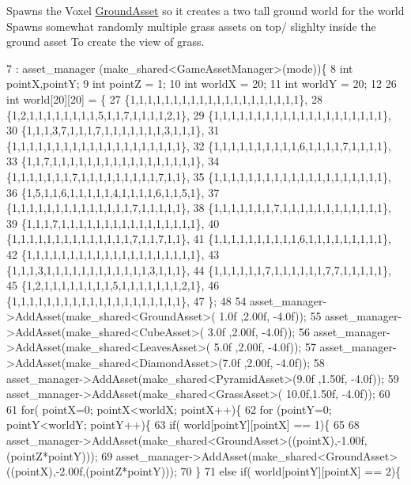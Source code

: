Spawns the Voxel \hyperlink{classGroundAsset}{Ground\+Asset} so it creates a two tall ground world for the world Spawns somewhat randomly multiple grass assets on top/ slighlty inside the ground asset To create the view of grass.
\begin{DoxyCode}
7                                           : asset\_manager (make\_shared<GameAssetManager>(mode))\{
8   \textcolor{keywordtype}{int} pointX,pointY;
9   \textcolor{keywordtype}{int} pointZ = 1;
10   \textcolor{keywordtype}{int} worldX = 20;
11   \textcolor{keywordtype}{int} worldY = 20;
12 
26   \textcolor{keywordtype}{int} world[20][20] = \{
27   \{1,1,1,1,1,1,1,1,1,1,1,1,1,1,1,1,1,1,1,1\},
28   \{1,2,1,1,1,1,1,1,1,1,5,1,1,7,1,1,1,1,2,1\},
29   \{1,1,1,1,1,1,1,1,1,1,1,1,1,1,1,1,1,1,1,1\},
30   \{1,1,1,3,7,1,1,1,7,1,1,1,1,1,1,1,3,1,1,1\},
31   \{1,1,1,1,1,1,1,1,1,1,1,1,1,1,1,1,1,1,1,1\},
32   \{1,1,1,1,1,1,1,1,1,1,6,1,1,1,1,7,1,1,1,1\},
33   \{1,1,7,1,1,1,1,1,1,1,1,1,1,1,1,1,1,1,1,1\},
34   \{1,1,1,1,1,1,1,7,1,1,1,1,1,1,1,1,1,7,1,1\},
35   \{1,1,1,1,1,1,1,1,1,1,1,1,1,1,1,1,1,1,1,1\},
36   \{1,5,1,1,6,1,1,1,1,1,4,1,1,1,1,6,1,1,5,1\},
37   \{1,1,1,1,1,1,1,1,1,1,1,1,1,1,7,1,1,1,1,1\},
38   \{1,1,1,1,1,1,1,7,1,1,1,1,1,1,1,1,1,1,1,1\},
39   \{1,1,1,7,1,1,1,1,1,1,1,1,1,1,1,1,1,1,1,1\},
40   \{1,1,1,1,1,1,1,1,1,1,1,1,1,1,7,1,1,7,1,1\},
41   \{1,1,1,1,1,1,1,1,1,1,6,1,1,1,1,1,1,1,1,1\},
42   \{1,1,1,1,1,1,1,1,1,1,1,1,1,1,1,1,1,1,1,1\},
43   \{1,1,1,3,1,1,1,1,1,1,1,1,1,1,1,1,3,1,1,1\},
44   \{1,1,1,1,1,1,7,1,1,1,1,1,1,7,7,1,1,1,1,1\},
45   \{1,2,1,1,1,1,1,1,1,1,5,1,1,1,1,1,1,1,2,1\},
46   \{1,1,1,1,1,1,1,1,1,1,1,1,1,1,1,1,1,1,1,1\},
47   \};
48   
54         asset\_manager->AddAsset(make\_shared<GroundAsset>( 1.0f ,2.00f, -4.0f));
55         asset\_manager->AddAsset(make\_shared<CubeAsset>(   3.0f ,2.00f, -4.0f));
56         asset\_manager->AddAsset(make\_shared<LeavesAsset>( 5.0f ,2.00f, -4.0f));
57         asset\_manager->AddAsset(make\_shared<DiamondAsset>(7.0f ,2.00f, -4.0f));
58         asset\_manager->AddAsset(make\_shared<PyramidAsset>(9.0f ,1.50f, -4.0f)); 
59         asset\_manager->AddAsset(make\_shared<GrassAsset>(  10.0f,1.50f, -4.0f));
60 
61   \textcolor{keywordflow}{for}( pointX=0; pointX<worldX; pointX++)\{
62    \textcolor{keywordflow}{for} (pointY=0; pointY<worldY; pointY++)\{
63     \textcolor{keywordflow}{if}( world[pointY][pointX] == 1)\{
65 
68             asset\_manager->AddAsset(make\_shared<GroundAsset>((pointX),-1.00f,(pointZ*pointY)));
69             asset\_manager->AddAsset(make\_shared<GroundAsset>((pointX),-2.00f,(pointZ*pointY)));
70    \}
71     \textcolor{keywordflow}{else} \textcolor{keywordflow}{if}( world[pointY][pointX] == 2)\{

\end{DoxyCode}
